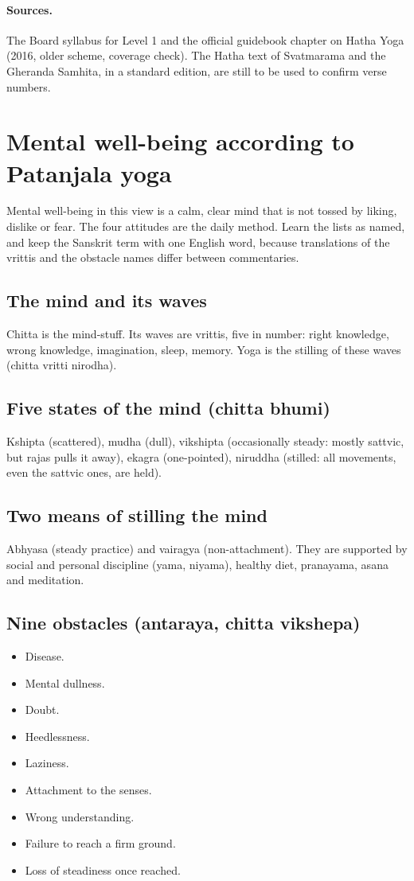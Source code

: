 \paragraph{Sources.} The Board syllabus for Level 1 and the official guidebook chapter on Hatha Yoga (2016, older scheme, coverage check). The Hatha text of Svatmarama and the Gheranda Samhita, in a standard edition, are still to be used to confirm verse numbers.

\section{Mental well-being according to Patanjala yoga}
\label{sec:mental-wellbeing-patanjala}

Mental well-being in this view is a calm, clear mind that is not tossed by liking, dislike or fear. The four attitudes are the daily method. Learn the lists as named, and keep the Sanskrit term with one English word, because translations of the vrittis and the obstacle names differ between commentaries.

\subsection*{The mind and its waves}
Chitta is the mind-stuff. Its waves are vrittis, five in number: right knowledge, wrong knowledge, imagination, sleep, memory. Yoga is the stilling of these waves (chitta vritti nirodha).

\subsection*{Five states of the mind (chitta bhumi)}
Kshipta (scattered), mudha (dull), vikshipta (occasionally steady: mostly sattvic, but rajas pulls it away), ekagra (one-pointed), niruddha (stilled: all movements, even the sattvic ones, are held).

\subsection*{Two means of stilling the mind}
Abhyasa (steady practice) and vairagya (non-attachment). They are supported by social and personal discipline (yama, niyama), healthy diet, pranayama, asana and meditation.

\subsection*{Nine obstacles (antaraya, chitta vikshepa)}
\begin{itemize}
\item Disease.
\item Mental dullness.
\item Doubt.
\item Heedlessness.
\item Laziness.
\item Attachment to the senses.
\item Wrong understanding.
\item Failure to reach a firm ground.
\item Loss of steadiness once reached.
\end{itemize}

